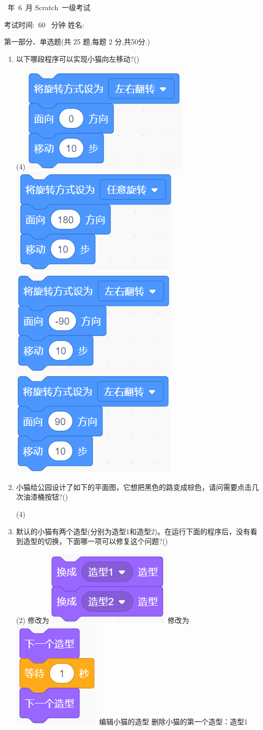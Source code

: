 \documentclass[10.5pt, a4paper]{article}
\renewcommand{\title}[3]{
    \begin{center}
        \Large\heiti #1~年~#2~月 Scratch~#3级考试
    \end{center}
}
\newcommand{\TimeAndName}[1]{
    \begin{center}
        考试时间:~#1~ 分钟 \qquad\qquad\qquad\qquad 姓名:\underline{\quad\quad\quad\quad}
    \end{center}
}
\begin{document}
    \title{2020}{6}{一}
    
    \TimeAndName{60}
    
    \vspace{1cm}
    {\noindent\heiti 第一部分、单选题(共 25 题,每题 2 分,共50分.)}

    \begin{enumerate}
        \item 以下哪段程序可以实现小猫向左移动?(\qquad)
        \begin{tasks}(4)
            \task \includegraphics[width=.15\textwidth]{1a.png}
            \task \includegraphics[width=.15\textwidth]{1b.png}
            \task \includegraphics[width=.15\textwidth]{1c.png}
            \task \includegraphics[width=.15\textwidth]{1d.png}
        \end{tasks}

        \item 小猫给公园设计了如下的平面图，它想把黑色的路变成棕色，请问需要点击几次油漆桶按钮?(\qquad)
        \begin{tasks}(4)
        \end{tasks}

        \item 默认的小猫有两个造型(分别为造型1和造型2)。在运行下面的程序后，没有看到造型的切换，下面哪一项可以修复这个问题?(\qquad)
        \begin{tasks}(2)
            \task 修改为\includegraphics[width=.12\textwidth]{3a.png}
            \task 修改为\includegraphics[width=.06\textwidth]{3b.png}
            \task 编辑小猫的造型
            \task 删除小猫的第一个造型：造型1
        \end{tasks}


\end{enumerate}
\end{document}
